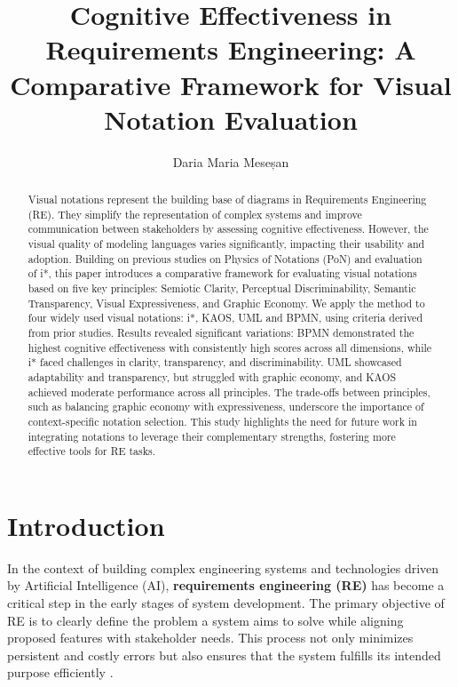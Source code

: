 \documentclass[runningheads]{llncs}
\begin{document}
%
\title{Cognitive Effectiveness in Requirements Engineering: A Comparative Framework for Visual Notation Evaluation}
%
%
\author{Daria Maria Meseșan}
%
%
%
\maketitle              %
%
\begin{abstract}
Visual notations represent the building base of diagrams in Requirements Engineering (RE). They simplify the representation of complex systems and improve communication between stakeholders by assessing cognitive effectiveness. However, the visual quality of modeling languages varies significantly, impacting their usability and adoption. Building on previous studies on Physics of Notations (PoN) and evaluation of i*, this paper introduces a comparative framework for evaluating visual notations based on five key principles: Semiotic Clarity, Perceptual Discriminability, Semantic Transparency, Visual Expressiveness, and Graphic Economy. We apply the method to four widely used visual notations: i*, KAOS, UML and BPMN, using criteria derived from prior studies.  Results revealed significant variations: BPMN demonstrated the highest cognitive effectiveness with consistently high scores across all dimensions, while i* faced challenges in clarity, transparency, and discriminability. UML showcased adaptability and transparency, but struggled with graphic economy, and KAOS achieved moderate performance across all principles. The trade-offs between principles, such as balancing graphic economy with expressiveness, underscore the importance of context-specific notation selection. This study highlights the need for future work in integrating notations to leverage their complementary strengths, fostering more effective tools for RE tasks.

\end{abstract}
%
%
%
\section{Introduction}
In the context of building complex engineering systems and technologies driven by Artificial Intelligence (AI), \textbf{ requirements engineering (RE)} has become a critical step in the early stages of system development. The primary objective of RE is to clearly define the problem a system aims to solve while aligning proposed features with stakeholder needs. This process not only minimizes persistent and costly errors but also ensures that the system fulfills its intended purpose efficiently \cite{Blouin2013}.
\end{document}
